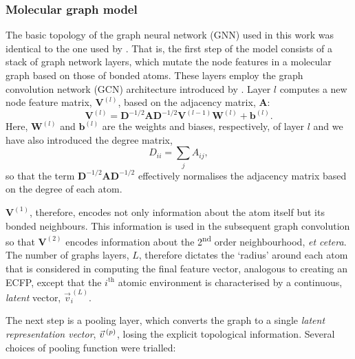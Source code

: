 \subsubsection{Molecular graph model}

The basic topology of the graph neural network (GNN) used in this work was identical to the one used by \citet{qinPredictingCriticalMicelle2021}. That is, the first step of the model consists of a stack of graph network layers, which mutate the node features in a molecular graph based on those of bonded atoms.
These layers employ the graph convolution network (GCN) architecture introduced by \cite{kipfSemiSupervisedClassificationGraph2017a}. Layer $l$ computes a new node feature matrix, $\mathbf{V}^{(l)}$, based on the adjacency matrix, $\mathbf{A}$:
\begin{equation}
    \mathbf{V}^{(l)} = \mathbf{D}^{-1/2} \mathbf{A} \mathbf{D}^{-1/2} \mathbf{V}^{(l-1)} \mathbf{W}^{(l)} + \mathbf{b}^{(l)}.
\end{equation}
Here, $\mathbf{W}^{(l)}$ and $\mathbf{b}^{(l)}$ are the weights and biases,
respectively, of layer $l$ and we have also introduced the degree matrix,
\begin{equation}
    D_{ii} = \sum_j A_{ij},
\end{equation}
so that the term $\mathbf{D}^{-1/2} \mathbf{A}
    \mathbf{D}^{-1/2}$ effectively normalises the adjacency matrix based on
the degree of each atom.

$\mathbf{V}^{(1)}$, therefore, encodes not only information about the atom itself but its bonded neighbours. This information is used in the subsequent graph convolution so that $\mathbf{V}^{(2)}$ encodes information about the
2\textsuperscript{nd} order neighbourhood, \emph{et cetera}. The number of graphs layers, $L$, therefore dictates the `radius' around each atom that is considered in computing the final feature vector, analogous to creating an ECFP, except that the $i^\text{th}$ atomic environment is characterised by a continuous, \emph{latent} vector, $\vec{v}^{\,(L)}_i$.

The next step is a pooling layer, which converts the graph to a single \emph{latent representation vector}, $\vec{v}^{\,(p)}{}$, losing the explicit topological information. Several choices of pooling function were trialled:

